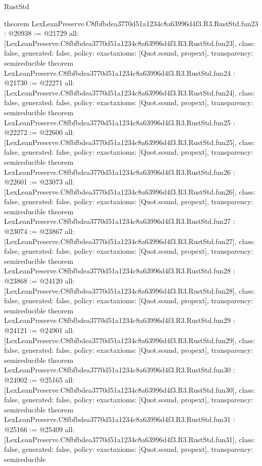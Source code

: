 \begin{lexlean}{RustStd}
\begin{coremodule}
{}
theorem LexLeanPreserve.C8fbfbdea3770d51a1234c8a63996d4f3.R3.RustStd.fun23 : @20938 := @21729 {
  all: [LexLeanPreserve.C8fbfbdea3770d51a1234c8a63996d4f3.R3.RustStd.fun23],
  class: false,
  generated: false,
  policy: exact{axioms: [Quot.sound, propext]},
  transparency: semireducible
}
theorem LexLeanPreserve.C8fbfbdea3770d51a1234c8a63996d4f3.R3.RustStd.fun24 : @21730 := @22271 {
  all: [LexLeanPreserve.C8fbfbdea3770d51a1234c8a63996d4f3.R3.RustStd.fun24],
  class: false,
  generated: false,
  policy: exact{axioms: [Quot.sound, propext]},
  transparency: semireducible
}
theorem LexLeanPreserve.C8fbfbdea3770d51a1234c8a63996d4f3.R3.RustStd.fun25 : @22272 := @22600 {
  all: [LexLeanPreserve.C8fbfbdea3770d51a1234c8a63996d4f3.R3.RustStd.fun25],
  class: false,
  generated: false,
  policy: exact{axioms: [Quot.sound, propext]},
  transparency: semireducible
}
theorem LexLeanPreserve.C8fbfbdea3770d51a1234c8a63996d4f3.R3.RustStd.fun26 : @22601 := @23073 {
  all: [LexLeanPreserve.C8fbfbdea3770d51a1234c8a63996d4f3.R3.RustStd.fun26],
  class: false,
  generated: false,
  policy: exact{axioms: [Quot.sound, propext]},
  transparency: semireducible
}
theorem LexLeanPreserve.C8fbfbdea3770d51a1234c8a63996d4f3.R3.RustStd.fun27 : @23074 := @23867 {
  all: [LexLeanPreserve.C8fbfbdea3770d51a1234c8a63996d4f3.R3.RustStd.fun27],
  class: false,
  generated: false,
  policy: exact{axioms: [Quot.sound, propext]},
  transparency: semireducible
}
theorem LexLeanPreserve.C8fbfbdea3770d51a1234c8a63996d4f3.R3.RustStd.fun28 : @23868 := @24120 {
  all: [LexLeanPreserve.C8fbfbdea3770d51a1234c8a63996d4f3.R3.RustStd.fun28],
  class: false,
  generated: false,
  policy: exact{axioms: [Quot.sound, propext]},
  transparency: semireducible
}
theorem LexLeanPreserve.C8fbfbdea3770d51a1234c8a63996d4f3.R3.RustStd.fun29 : @24121 := @24901 {
  all: [LexLeanPreserve.C8fbfbdea3770d51a1234c8a63996d4f3.R3.RustStd.fun29],
  class: false,
  generated: false,
  policy: exact{axioms: [Quot.sound, propext]},
  transparency: semireducible
}
theorem LexLeanPreserve.C8fbfbdea3770d51a1234c8a63996d4f3.R3.RustStd.fun30 : @24902 := @25165 {
  all: [LexLeanPreserve.C8fbfbdea3770d51a1234c8a63996d4f3.R3.RustStd.fun30],
  class: false,
  generated: false,
  policy: exact{axioms: [Quot.sound, propext]},
  transparency: semireducible
}
theorem LexLeanPreserve.C8fbfbdea3770d51a1234c8a63996d4f3.R3.RustStd.fun31 : @25166 := @25409 {
  all: [LexLeanPreserve.C8fbfbdea3770d51a1234c8a63996d4f3.R3.RustStd.fun31],
  class: false,
  generated: false,
  policy: exact{axioms: [Quot.sound, propext]},
  transparency: semireducible
}
\end{coremodule}
\end{lexlean}
